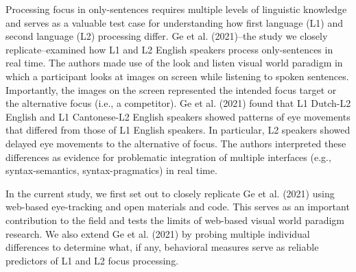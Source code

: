 Processing focus in only-sentences requires multiple levels of linguistic knowledge and serves as a valuable test case for understanding how first language (L1) and second language (L2) processing differ. Ge et al. (2021)--the study we closely replicate–examined how L1 and L2 English speakers process only-sentences in real time. The authors made use of the look and listen visual world paradigm in which a participant looks at images on screen while listening to spoken sentences. Importantly, the images on the screen represented the intended focus target or the alternative focus (i.e., a competitor). Ge et al. (2021) found that L1 Dutch-L2 English and L1 Cantonese-L2 English speakers showed patterns of eye movements that differed from those of L1 English speakers. In particular, L2 speakers showed delayed eye movements to the alternative of focus. The authors interpreted these differences as evidence for problematic integration of multiple interfaces (e.g., syntax-semantics, syntax-pragmatics) in real time. 

In the current study, we first set out to closely replicate Ge et al. (2021) using web-based eye-tracking and open materials and code. This serves as an important contribution to the field and tests the limits of web-based visual world paradigm research. We also extend Ge et al. (2021) by probing multiple individual differences to determine what, if any, behavioral measures serve as reliable predictors of L1 and L2 focus processing. 
